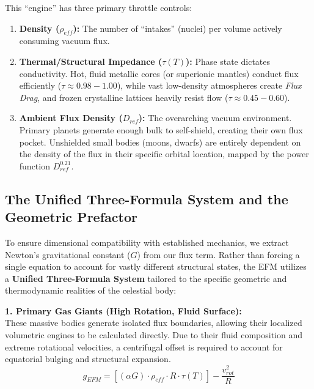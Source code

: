\documentclass[11pt, a4paper]{article}
\begin{document}
This ``engine'' has three primary throttle controls:
\begin{enumerate}
  \item \textbf{Density ($\rho_{eff}$):} The number of ``intakes'' (nuclei) per volume actively consuming vacuum flux.
  \item \textbf{Thermal/Structural Impedance ($\tau(T)$):} Phase state dictates conductivity. Hot, fluid metallic cores (or superionic mantles) conduct flux efficiently ($\tau \approx 0.98 - 1.00$), while vast low-density atmospheres create \textit{Flux Drag}, and frozen crystalline lattices heavily resist flow ($\tau \approx 0.45 - 0.60$).
  \item \textbf{Ambient Flux Density ($D_{ref}$):} The overarching vacuum environment. Primary planets generate enough bulk to self-shield, creating their own flux pocket. Unshielded small bodies (moons, dwarfs) are entirely dependent on the density of the flux in their specific orbital location, mapped by the power function $D_{ref}^{0.21}$.
\end{enumerate}

\subsection{The Unified Three-Formula System and the Geometric Prefactor}

To ensure dimensional compatibility with established mechanics, we extract Newton's gravitational constant ($G$) from our flux term. Rather than forcing a single equation to account for vastly different structural states, the EFM utilizes a \textbf{Unified Three-Formula System} tailored to the specific geometric and thermodynamic realities of the celestial body:

\textbf{1. Primary Gas Giants (High Rotation, Fluid Surface):} \\
These massive bodies generate isolated flux boundaries, allowing their localized volumetric engines to be calculated directly. Due to their fluid composition and extreme rotational velocities, a centrifugal offset is required to account for equatorial bulging and structural expansion.
\begin{equation}
  g_{EFM} = \left[ (\alpha G) \cdot \rho_{eff} \cdot R \cdot \tau(T) \right] - \frac{v_{rot}^2}{R}
\end{equation}
\end{document}
